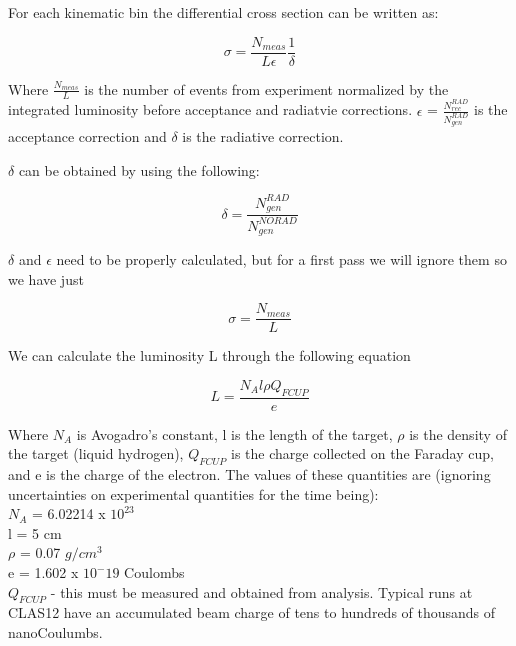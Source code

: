 

For each kinematic bin the differential cross section can be written as:

\begin{equation}
    \sigma = \frac{N_{meas}}{L \epsilon}\frac{1}{\delta}
\end{equation}

Where $\frac{N_{meas}}{L}$ is the number of events from experiment normalized by the integrated luminosity before acceptance and radiatvie corrections. $\epsilon$ = $\frac{N^{RAD}_{rec}}{{N^{RAD}_{gen}}}$ is the acceptance correction and $\delta$ is the radiative correction.



$\delta$ can be obtained by using the following:

\begin{equation}
    \delta = \frac{N^{RAD}_{gen}}{N^{NORAD}_{gen}}
\end{equation}

$\delta$ and $\epsilon$ need to be properly calculated, but for a first pass we will ignore them so we have just


\begin{equation}
    \sigma = \frac{N_{meas}}{L}
\end{equation}

We can calculate the luminosity L through the following equation

\begin{equation}
    L = \frac{N_A l \rho Q_{FCUP}}{e}
\end{equation}

Where $N_A$ is Avogadro's constant, l is the length of the target,  $\rho$ is the density of the target (liquid hydrogen), $Q_{FCUP}$ is the charge collected on the Faraday cup, and e is the charge of the electron. The values of these quantities are (ignoring uncertainties on experimental quantities for the time being):\\

$N_A$ = 6.02214 x $10^{23}$\\
l = 5 cm\\
$\rho$ = 0.07 $g/cm^3$\\
e = 1.602 x $10^-19$ Coulombs\\
$Q_{FCUP}$ - this must be measured and obtained from analysis. Typical runs at CLAS12 have an accumulated beam charge of tens to hundreds of thousands of nanoCoulumbs. 





